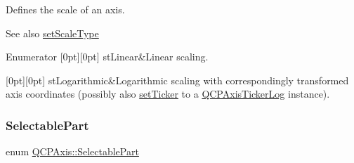 Defines the scale of an axis. \begin{DoxySeeAlso}{See also}
\hyperlink{class_q_c_p_axis_adef29cae617af4f519f6c40d1a866ca6}{set\+Scale\+Type} 
\end{DoxySeeAlso}
\begin{DoxyEnumFields}{Enumerator}
[0pt][0pt]{}\mbox{\label{class_q_c_p_axis_a36d8e8658dbaa179bf2aeb973db2d6f0aff6e30a11a828bc850caffab0ff994f6}} 
st\+Linear&Linear scaling. \\
\hline

[0pt][0pt]{}\mbox{\label{class_q_c_p_axis_a36d8e8658dbaa179bf2aeb973db2d6f0abf5b785ad976618816dc6f79b73216d4}} 
st\+Logarithmic&Logarithmic scaling with correspondingly transformed axis coordinates (possibly also \hyperlink{class_q_c_p_axis_a4ee03fcd2c74d05cd1a419b9af5cfbdc}{set\+Ticker} to a \hyperlink{class_q_c_p_axis_ticker_log}{Q\+C\+P\+Axis\+Ticker\+Log} instance). \\
\hline

\end{DoxyEnumFields}
\mbox{\label{class_q_c_p_axis_abee4c7a54c468b1385dfce2c898b115f}} 
\subsubsection{\texorpdfstring{Selectable\+Part}{SelectablePart}}
{\footnotesize\ttfamily enum \hyperlink{class_q_c_p_axis_abee4c7a54c468b1385dfce2c898b115f}{Q\+C\+P\+Axis\+::\+Selectable\+Part}}

